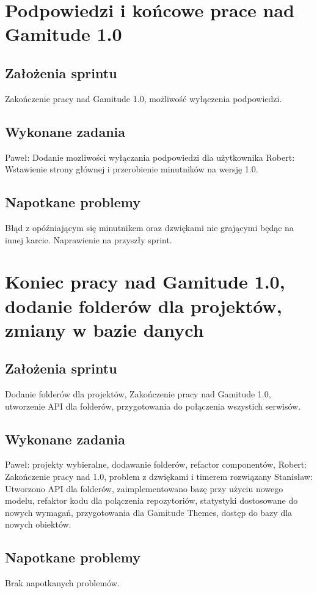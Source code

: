 \documentclass[a4paper,11pt]{report}
\begin{document}
\section {Podpowiedzi i końcowe prace nad Gamitude 1.0}
\subsection {Założenia sprintu}
Zakończenie pracy nad Gamitude 1.0, możliwość wyłączenia podpowiedzi.
\subsection {Wykonane zadania}
Paweł: Dodanie mozliwości wyłączania podpowiedzi dla użytkownika 
Robert: Wstawienie strony głównej i przerobienie minutników na wersję 1.0. 
\subsection {Napotkane problemy}
Błąd z opóźniającym się minutnikem oraz dzwiękami nie grającymi będąc na innej karcie. Naprawienie na przyszły sprint.

\section {Koniec pracy nad Gamitude 1.0, dodanie folderów dla projektów, zmiany w bazie danych}
\subsection {Założenia sprintu}
Dodanie folderów dla projektów, Zakończenie pracy nad Gamitude 1.0, utworzenie API dla folderów, przygotowania do połączenia wszystich serwisów.
\subsection {Wykonane zadania}
Paweł: projekty wybieralne, dodawanie folderów, refactor componentów, 
Robert: Zakończenie pracy nad 1.0, problem z dzwiękami i timerem rozwiązany 
Stanisław: Utworzono API dla folderów, zaimplementowano bazę przy użyciu nowego modelu, refaktor kodu dla polączenia repozytoriów, statystyki dostosowane do nowych wymagań, przygotowania dla Gamitude Themes, dostęp do bazy dla nowych obiektów. 
\subsection {Napotkane problemy}
Brak napotkanych problemów.
\end{document}

